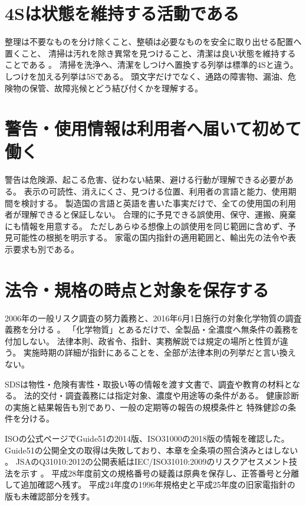 \section{4Sは状態を維持する活動である}
\label{theory:safety:housekeeping}
整理は不要なものを分け除くこと、整頓は必要なものを安全に取り出せる配置へ置くこと、
清掃は汚れを除き異常を見つけること、清潔は良い状態を維持することである
\cite{saf_4s}。
清掃を洗浄へ、清潔をしつけへ置換する列挙は標準的4Sと違う。
しつけを加える列挙は5Sである。
頭文字だけでなく、通路の障害物、漏油、危険物の保管、故障兆候とどう結び付くかを理解する。

\section{警告・使用情報は利用者へ届いて初めて働く}
\label{theory:safety:warnings}
警告は危険源、起こる危害、従わない結果、避ける行動が理解できる必要がある。
表示の可読性、消えにくさ、見つける位置、利用者の言語と能力、使用期間を検討する。
製造国の言語と英語を書いた事実だけで、全ての使用国の利用者が理解できると保証しない。
合理的に予見できる誤使用、保守、運搬、廃棄にも情報を用意する。
ただしあらゆる想像上の誤使用を同じ範囲に含めず、予見可能性の根拠を明示する。
家電の国内指針の適用範囲と、輸出先の法令や表示要求も別である\cite{saf_aeha}。

\section{法令・規格の時点と対象を保存する}
\label{theory:safety:law}
\label{theory:safety:standards}
\begin{tcolorbox}[title=出題当時の制度と法源]
2006年の一般リスク調査の努力義務と、2016年6月1日施行の対象化学物質の調査義務を分ける
\cite{saf_ra2006,saf_chem2016}。
「化学物質」とあるだけで、全製品・全濃度へ無条件の義務を付加しない。
法律本則、政省令、指針、実務解説では規定の場所と性質が違う。
実施時期の詳細が指針にあることを、全部が法律本則の列挙だと言い換えない。
\end{tcolorbox}
SDSは物性・危険有害性・取扱い等の情報を渡す文書で、調査や教育の材料となる。
法的交付・調査義務には指定対象、濃度や用途等の条件がある\cite{saf_chemqa}。
健康診断の実施と結果報告も別であり、一般の定期等の報告の規模条件と
特殊健診の条件を分ける\cite{saf_healthreport}。

\begin{tcolorbox}[title=規格本文の確認範囲]
ISOの公式ページでGuide51の2014版、ISO31000の2018版の情報を確認した。
Guide51の公開全文の取得は失敗しており、本章を全条項の照合済みとはしない
\cite{saf_guide51,saf_iso31000}。
JSAのQ31010:2012の公開表紙はIEC/ISO31010:2009のリスクアセスメント技法を示す
\cite{saf_jis31010}。
平成28年度前文の規格番号の疑義は原典を保存し、正答番号と分離して追加確認へ残す。
平成24年度の1996年規格史と平成25年度の旧家電指針の版も未確認部分を残す。
\end{tcolorbox}

